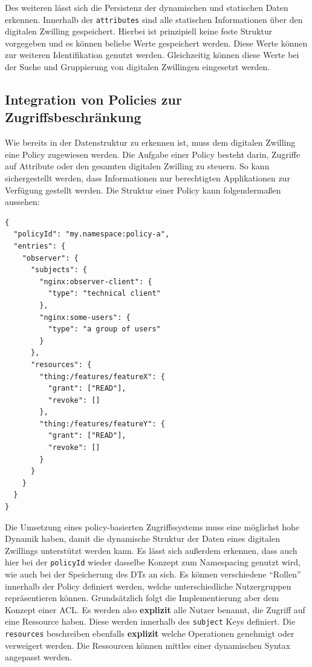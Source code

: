 Des weiteren lässt sich die Persistenz der dynamischen und statischen Daten erkennen. Innerhalb der \texttt{attributes} sind alle statischen Informationen über den digitalen Zwilling gespeichert. Hierbei ist prinzipiell keine feste Struktur vorgegeben und es können beliebe Werte gespeichert werden. Diese Werte können zur weiteren Identifikation genutzt werden. Gleichzeitig können diese Werte bei der Suche und Gruppierung von digitalen Zwillingen eingesetzt werden.

\subsection{Integration von Policies zur Zugriffsbeschränkung}

Wie bereits in der Datenstruktur zu erkennen ist, muss dem digitalen Zwilling eine Policy zugewiesen werden. Die Aufgabe einer Policy besteht darin, Zugriffe auf Attribute oder den gesamten digitalen Zwilling zu steuern. So kann sichergestellt werden, dass Informationen nur berechtigten Applikationen zur Verfügung gestellt werden. Die Struktur einer Policy kann folgendermaßen aussehen:

\begin{verbatim}
{
  "policyId": "my.namespace:policy-a",
  "entries": {
    "observer": {
      "subjects": {
        "nginx:observer-client": {
          "type": "technical client"
        },
        "nginx:some-users": {
          "type": "a group of users"
        }
      },
      "resources": {
        "thing:/features/featureX": {
          "grant": ["READ"],
          "revoke": []
        },
        "thing:/features/featureY": {
          "grant": ["READ"],
          "revoke": []
        }
      }
    }
  }
}
\end{verbatim}

Die Umsetzung eines policy-basierten Zugriffssystems muss eine möglichst hohe Dynamik haben, damit die dynamische Struktur der Daten eines digitalen Zwillings unterstützt werden kann. Es lässt sich außerdem erkennen, dass auch hier bei der \texttt{policyId} wieder dasselbe Konzept zum Namespacing genutzt wird, wie auch bei der Speicherung des \ac{DT}s an sich. Es können verschiedene \enquote{Rollen} innerhalb der Policy definiert werden, welche unterschiedliche Nutzergruppen repräsentieren können. Grundsätzlich folgt die Implementierung aber dem Konzept einer \ac{ACL}. Es werden also \textbf{explizit} alle Nutzer benannt, die Zugriff auf eine Ressource haben. Diese werden innerhalb des \texttt{subject} Keys definiert. Die \texttt{resources} beschreiben ebenfalls \textbf{explizit} welche Operationen genehmigt oder verweigert werden. Die Ressourcen können mittles einer dynamischen Syntax angepasst werden.


